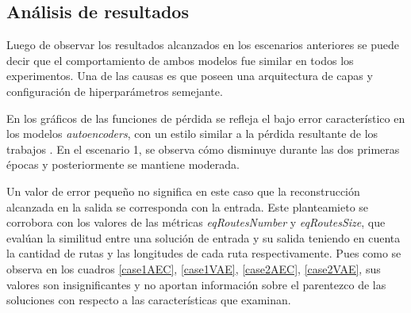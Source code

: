 \begin{figure}[!h]
	\label{space_case2vae}
\end{figure}

\newpage

\subsection{Análisis de resultados}

Luego de observar los resultados alcanzados en los escenarios anteriores se puede decir que el comportamiento de ambos modelos fue similar en todos los experimentos. Una de las causas es que poseen una arquitectura de capas y configuración de hiperparámetros semejante. 

En los gráficos de las funciones de pérdida se refleja el bajo error característico en los modelos \textit{autoencoders}, con un estilo similar a la pérdida resultante de los trabajos \cite{TrajectoryCompres, VAESparseData}. En el escenario 1, se observa cómo disminuye durante las dos primeras épocas y posteriormente se mantiene moderada.

Un valor de error pequeño no significa en este caso que la reconstrucción alcanzada en la salida se corresponda con la entrada. Este planteamieto se corrobora con los valores de las métricas \textit{eqRoutesNumber} y \textit{eqRoutesSize}, que evalúan la similitud entre una solución de entrada y su salida teniendo en cuenta la cantidad de rutas y las longitudes de cada ruta respectivamente. Pues como se observa en los cuadros \ref{case1AEC}, \ref{case1VAE}, \ref{case2AEC}, \ref{case2VAE}, sus valores son insignificantes y no aportan información sobre el parentezco de las soluciones con respecto a las características que examinan.

 

